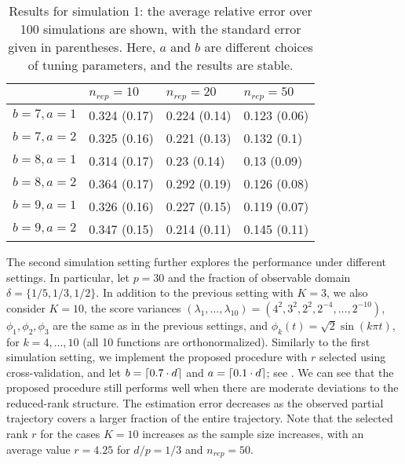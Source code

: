\documentclass[11pt]{article}
\DeclarePairedDelimiter\ceil{\lceil}{\rceil}
\newcommand{\0}{{\mathbf{0}}}
\newcommand{\1}{{\mathbf{1}}}
\begin{document}
\begin{table}[ht]
	\caption{Results for simulation 1: the average relative error over 100 simulations are shown, with the standard error given in parentheses. Here, $a$ and $b$ are different choices of tuning parameters, and the results are stable. }
	\vskip 5pt
	\label{tab:simu1}
	\centering
	\vskip 2pt
	\begin{tabular}{r|lll}
		\hline
		\hline
		& $n_{rep}=10$ & $n_{rep}= 20$ & $n_{rep} = 50$  \\ 
		\hline
		$b=7,a=1$ & 0.324 (0.17) & 0.224 (0.14) & 0.123 (0.06) \\ 
		$b=7,a=2$  & 0.325 (0.16) & 0.221 (0.13) & 0.132 (0.1) \\ 
		$b=8,a=1$ & 0.314 (0.17) & 0.23 (0.14) & 0.13 (0.09) \\ 
		$b=8,a=2$ & 0.364 (0.17) & 0.292 (0.19) & 0.126 (0.08) \\ 
		$b=9,a=1$ & 0.326 (0.16) & 0.227 (0.15) & 0.119 (0.07) \\ 
		$b=9,a =2$ & 0.347 (0.15) & 0.214 (0.11) & 0.145 (0.11) \\ 
		\hline
	\end{tabular}
\end{table}






The second simulation setting further explores the performance under different settings. In particular, let $p=30$ and the fraction of observable domain $\delta = \{1/5, 1/3, 1/2\}$. In addition to the previous setting with $K=3$, we also consider $K=10$, the score variances $(\lambda_1,\ldots, \lambda_{10}) = (4^2, 3^2, 2^2, 2^{-4}, \ldots, 2^{-10})$, 
$\phi_1, \phi_2, \phi_3$ are the same as in the previous settings, and $\phi_k(t) = \sqrt{2}\sin(k\pi t)$, for $k = 4, \dots, 10$ (all 10 functions are orthonormalized). 
Similarly to the first simulation setting, we implement the proposed procedure with $r$ selected using cross-validation, and let $b= \ceil{0.7\cdot d}$ and $a = \ceil{0.1\cdot d}$; see . We can see that the proposed procedure still performs well when there are moderate deviations to the reduced-rank structure. The estimation error decreases as the observed partial trajectory covers a larger fraction of the entire trajectory. 
Note that the selected rank $r$ for the cases $K=10$ increases as the sample size increases, with an average value $r = 4.25$ for $d/p = 1/3$ and $n_{rep} = 50$. 
\end{document}
